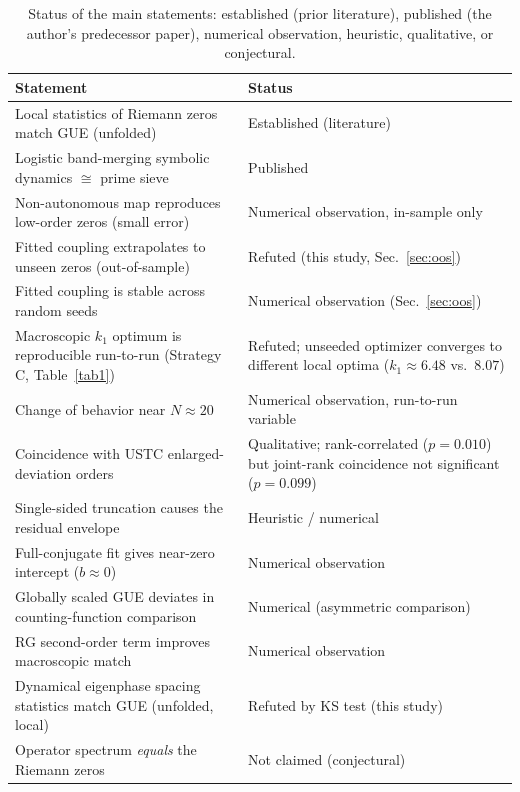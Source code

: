\documentclass[mca,article,submit,oneauthor,pdftex]{Definitions/mdpi}
\begin{document}
\begin{table}[H]
\caption{\label{tab:claims}Status of the main statements: established (prior literature), published (the author's predecessor paper), numerical observation, heuristic, qualitative, or conjectural.}
\begin{tabularx}{\textwidth}{Y{0.62}Y{0.38}}
\toprule
Statement & Status \\
\midrule
Local statistics of Riemann zeros match GUE (unfolded) & Established (literature) \\
Logistic band-merging symbolic dynamics $\cong$ prime sieve & Published \cite{wang2026} \\
Non-autonomous map reproduces low-order zeros (small error) & Numerical observation, in-sample only \\
Fitted coupling extrapolates to unseen zeros (out-of-sample) & Refuted (this study, Sec.~\ref{sec:oos}) \\
Fitted coupling is stable across random seeds & Numerical observation (Sec.~\ref{sec:oos}) \\
Macroscopic $k_1$ optimum is reproducible run-to-run (Strategy C, Table~\ref{tab1}) & Refuted; unseeded optimizer converges to different local optima ($k_1\approx6.48$ vs.\ $8.07$) \\
Change of behavior near $N\approx20$ & Numerical observation, run-to-run variable \\
Coincidence with USTC enlarged-deviation orders & Qualitative; rank-correlated ($p=0.010$) but joint-rank coincidence not significant ($p=0.099$) \\
Single-sided truncation causes the residual envelope & Heuristic / numerical \\
Full-conjugate fit gives near-zero intercept ($b\approx0$) & Numerical observation \\
Globally scaled GUE deviates in counting-function comparison & Numerical (asymmetric comparison) \\
RG second-order term improves macroscopic match & Numerical observation \\
Dynamical eigenphase spacing statistics match GUE (unfolded, local) & Refuted by KS test (this study) \\
Operator spectrum \emph{equals} the Riemann zeros & Not claimed (conjectural) \\
\bottomrule
\end{tabularx}

\end{table}
\end{document}
